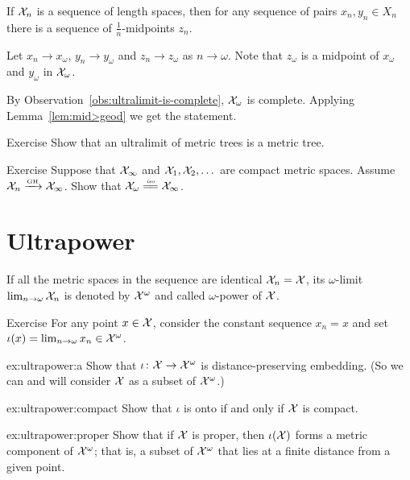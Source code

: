 If $\mathcal{X}_n$ is a sequence of length spaces, then for any sequence of pairs $x_n, y_n\in X_n$ there is a sequence of $\tfrac1n$-midpoints $z_n$.

Let $x_n\to x_\omega$, $y_n\to y_\omega$ and $z_n\to z_\omega$ as $n\to \omega$.
Note that $z_\omega$ is a midpoint of $x_\omega$ and $y_\omega$ in $\mathcal{X}_\omega$.

By Observation~\ref{obs:ultralimit-is-complete}, $\mathcal{X}_\omega$ is complete.
Applying Lemma~\ref{lem:mid>geod} we get the statement.
\qeds


\begin{thm}{Exercise}\label{ex:lim(tree)}
Show that an ultralimit of metric trees is a metric tree. 
\end{thm}

\begin{thm}{Exercise}\label{ex:ultracompact}
Suppose that $\mathcal{X}_\infty$ and $\mathcal{X}_1,\mathcal{X}_2,\dots$ are compact metric spaces.
Assume $\mathcal{X}_n\xrightarrow{\mbox{\tiny\rm GH}}\mathcal{X}_\infty$.
Show that $\spc{X}_\omega\iso\spc{X}_\infty$.
\end{thm}


\section{Ultrapower}

If all the metric spaces in the sequence are identical $\mathcal{X}_n=\mathcal{X}$, 
its $\omega$-limit 
$\lim_{n\to\omega}\mathcal{X}_n$
is denoted by $\mathcal{X}^\omega$
and called $\omega$-power of $\mathcal{X}$.



\begin{thm}{Exercise}\label{ex:ultrapower}
For any point $x\in \mathcal{X}$, consider the constant sequence $x_n=x$
and set $\iota(x)=\lim_{n\to\omega}x_n\in\mathcal{X}^\omega$.

\begin{subthm}{ex:ultrapower:a}
Show that $\iota\colon\mathcal{X}\to\mathcal{X}^\omega$ is distance-preserving embedding. (So we can and will consider $\mathcal{X}$ as a subset of $\mathcal{X}^\omega$.)
\end{subthm}

\begin{subthm}{ex:ultrapower:compact} 
Show that $\iota$ is onto if and only if $\mathcal{X}$ is compact.
\end{subthm}

\begin{subthm}{ex:ultrapower:proper} 
Show that if $\mathcal{X}$ is proper, then $\iota(\mathcal{X})$ forms a metric component of $\mathcal{X}^\omega$; that is, a subset of $\mathcal{X}^\omega$ that lies at a finite distance from a given point.
\end{subthm}

\end{thm}

